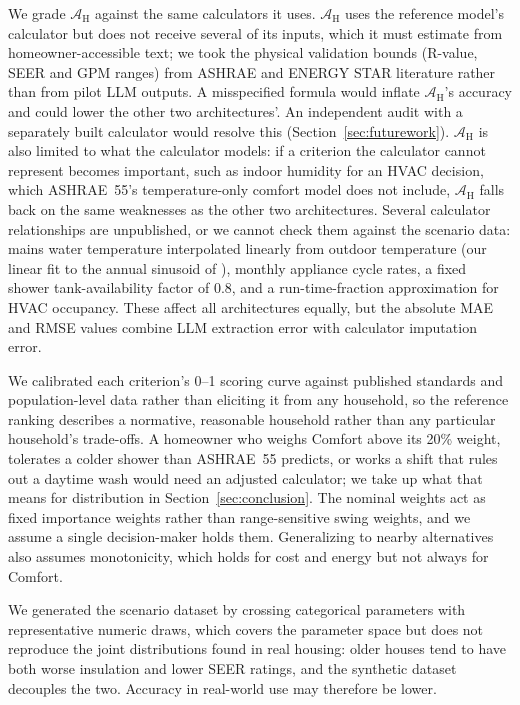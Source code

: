 \documentclass[final,3p,times]{elsarticle}
\begin{document}
We grade $\mathcal{A}_{\text{H}}$ against the same calculators it uses. $\mathcal{A}_{\text{H}}$ uses the reference model's calculator but does not receive several of its inputs, which it must estimate from homeowner-accessible text; we took the physical validation bounds (R-value, SEER and GPM ranges) from ASHRAE and ENERGY STAR literature rather than from pilot LLM outputs. A misspecified formula would inflate $\mathcal{A}_{\text{H}}$'s accuracy and could lower the other two architectures'. An independent audit with a separately built calculator would resolve this (Section~\ref{sec:futurework}). $\mathcal{A}_{\text{H}}$ is also limited to what the calculator models: if a criterion the calculator cannot represent becomes important, such as indoor humidity for an HVAC decision, which ASHRAE~55's temperature-only comfort model does not include, $\mathcal{A}_{\text{H}}$ falls back on the same weaknesses as the other two architectures. Several calculator relationships are unpublished, or we cannot check them against the scenario data: mains water temperature interpolated linearly from outdoor temperature (our linear fit to the annual sinusoid of \citet{burch2007}), monthly appliance cycle rates, a fixed shower tank-availability factor of 0.8, and a run-time-fraction approximation for HVAC occupancy. These affect all architectures equally, but the absolute MAE and RMSE values combine LLM extraction error with calculator imputation error.

We calibrated each criterion's 0--1 scoring curve against published standards and population-level data rather than eliciting it from any household, so the reference ranking describes a normative, reasonable household rather than any particular household's trade-offs. A homeowner who weighs Comfort above its 20\% weight, tolerates a colder shower than ASHRAE~55 predicts, or works a shift that rules out a daytime wash would need an adjusted calculator; we take up what that means for distribution in Section~\ref{sec:conclusion}. The nominal weights act as fixed importance weights rather than range-sensitive swing weights, and we assume a single decision-maker holds them. Generalizing to nearby alternatives also assumes monotonicity, which holds for cost and energy but not always for Comfort.

We generated the scenario dataset by crossing categorical parameters with representative numeric draws, which covers the parameter space but does not reproduce the joint distributions found in real housing: older houses tend to have both worse insulation and lower SEER ratings, and the synthetic dataset decouples the two. Accuracy in real-world use may therefore be lower.
\end{document}
